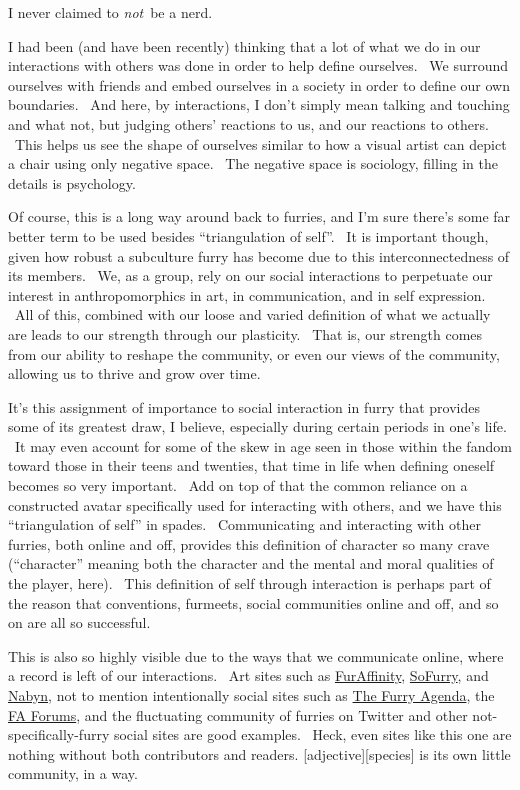 I never claimed to \emph{not}~be a nerd.

I had been (and have been recently) thinking that a lot of what we do in
our interactions with others was done in order to help define ourselves.
~We surround ourselves with friends and embed ourselves in a society in
order to define our own boundaries. ~And here, by interactions, I don't
simply mean talking and touching and what not, but judging others'
reactions to us, and our reactions to others. ~This helps us see the
shape of ourselves similar to how a visual artist can depict a chair
using only negative space. ~The negative space is sociology, filling in
the details is psychology.

Of course, this is a long way around back to furries, and I'm sure
there's some far better term to be used besides ``triangulation of
self''. ~It is important though, given how robust a subculture furry has
become due to this interconnectedness of its members. ~We, as a group,
rely on our social interactions to perpetuate our interest in
anthropomorphics in art, in communication, and in self expression. ~All
of this, combined with our loose and varied definition of what we
actually are leads to our strength through our plasticity. ~That is, our
strength comes from our ability to reshape the community, or even our
views of the community, allowing us to thrive and grow over time.

It's this assignment of importance to social interaction in furry that
provides some of its greatest draw, I believe, especially during certain
periods in one's life. ~It may even account for some of the skew in age
seen in those within the fandom toward those in their teens and
twenties, that time in life when defining oneself becomes so very
important. ~Add on top of that the common reliance on a constructed
avatar specifically used for interacting with others, and we have this
``triangulation of self'' in spades. ~Communicating and interacting with
other furries, both online and off, provides this definition of
character so many crave (``character'' meaning both the character and
the mental and moral qualities of the player, here). ~This definition of
self through interaction is perhaps part of the reason that conventions,
furmeets, social communities online and off, and so on are all so
successful.

This is also so highly visible due to the ways that we communicate
online, where a record is left of our interactions. ~Art sites such as
\href{http://furaffinity.net}{FurAffinity},
\href{http://sofurry.com}{SoFurry}, and \href{http://nabyn.com}{Nabyn},
not to mention intentionally social sites such as
\href{http://www.furryagenda.com}{The Furry Agenda}, the
\href{http://forums.furaffinity.net/}{FA Forums}, and the fluctuating
community of furries on Twitter and other not-specifically-furry social
sites are good examples. ~Heck, even sites like this one are nothing
without both contributors and readers. {[}adjective{]}{[}species{]} is
its own little community, in a way.

